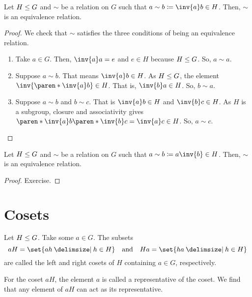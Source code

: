 \documentclass[11pt]{penrose}
\begin{document}
\begin{nthm}
    Let $H \mathrel{\leq} G$ and $\sim$ be a relation on $G$ such that $a \sim b \coloneq \inv{a} b \in H$. Then, $\sim$ is an equivalence relation.
\end{nthm}
\begin{proof}
    We check that $\sim$ satisfies the three conditions of being an equivalence relation.
    \begin{enumerate}
        \item Take $a \in G$. Then, $\inv{a} a = e$ and $e \in H$ because $H \mathrel{\leq} G$. So, $a \sim a$.

        \item Suppose $a \sim b$. That means $\inv{a} b \in H$. As $H \mathrel{\leq} G$, the element $\inv{\paren*{\inv{a} b}} \in H$. That is, $\inv{b} a \in H$. So, $b \sim a$.

        \item Suppose $a \sim b$ and $b \sim c$. That is $\inv{a} b \in H$ and $\inv{b} c \in H$. As $H$ is a subgroup, closure and associativity gives $\paren*{\inv{a} b} \paren*{\inv{b} c} = \inv{a} c \in H$. So, $a \sim c$. \qedhere
    \end{enumerate}
\end{proof}

\begin{nthm}
    Let $H \mathrel{\leq} G$ and $\sim$ be a relation on $G$ such that $a \sim b \coloneq a \inv{b} \in H$. Then, $\sim$ is an equivalence relation.
\end{nthm}
\begin{proof}
    Exercise.
\end{proof}

\section{Cosets}
\begin{ndfn}
    Let $H \mathrel{\leq} G$. Take some $a \in G$. The subsets
    \begin{equation}
        aH = \set{ah \st h \in H}
        \quad\text{and}\quad
        Ha = \set{ha \st h \in H}
    \end{equation}
    are called the left and right cosets of $H$ containing $a \in G$, respectively.
\end{ndfn}

For the coset $aH$, the element $a$ is called a representative of the coset. We find that any element of $aH$ can act as its representative.
\end{document}
